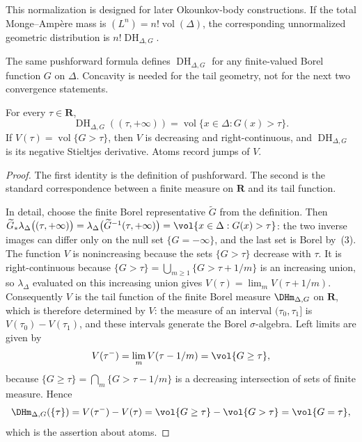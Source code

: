 This normalization is designed for later Okounkov-body constructions.  If
the total Monge--Amp\`ere mass is $(L^n)=n!\operatorname{vol}(\Delta)$, the
corresponding unnormalized geometric distribution is
$n!\operatorname{DH}_{\Delta,G}$.

The same pushforward formula defines $\operatorname{DH}_{\Delta,G}$ for any
finite-valued Borel function $G$ on $\Delta$.  Concavity is needed for the
tail geometry, not for the next two convergence statements.

\begin{proposition}\label{prop:dh-tail}
For every $\tau\in\mathbf R$,
\[
 \operatorname{DH}_{\Delta,G}((\tau,+\infty))
 =\operatorname{vol}\{x\in\Delta:G(x)>\tau\}.
\]
If
$V(\tau)=\operatorname{vol}\{G>\tau\}$, then $V$ is decreasing and
right-continuous, and $\operatorname{DH}_{\Delta,G}$ is its negative
Stieltjes derivative.  Atoms record jumps of $V$.
\end{proposition}

\begin{proof}
The first identity is the definition of pushforward.  The second is the
standard correspondence between a finite measure on $\mathbf R$ and its tail
function.

In detail, choose the finite Borel representative $\widetilde G$ from the
definition.  Then
$\widetilde G_*\lambda_\Delta\bigl((\tau,+\infty)\bigr)
=\lambda_\Delta\bigl(\widetilde G^{-1}(\tau,+\infty)\bigr)
=\vol\{x\in\Delta:G(x)>\tau\}$: the two inverse images can differ only on
the null set $\{G=-\infty\}$, and the last set is Borel by
\,(3).  The function $V$ is
nonincreasing because the sets $\{G>\tau\}$ decrease with $\tau$.  It is
right-continuous because
$\{G>\tau\}=\bigcup_{m\geq1}\{G>\tau+1/m\}$ is an increasing union, so
$\lambda_\Delta$ evaluated on this increasing union gives
$V(\tau)=\lim_mV(\tau+1/m)$.  Consequently $V$ is the tail function of the finite Borel measure
$\DHm_{\Delta,G}$ on $\mathbf R$, which is therefore determined by $V$: the
measure of an interval $(\tau_0,\tau_1]$ is $V(\tau_0)-V(\tau_1)$, and these
intervals generate the Borel $\sigma$-algebra.  Left limits are given by
\[
 V(\tau^-)=\lim_{m}V(\tau-1/m)=\vol\{G\geq\tau\},
\]
because $\{G\geq\tau\}=\bigcap_m\{G>\tau-1/m\}$ is a decreasing intersection
of sets of finite measure.  Hence
\[
 \DHm_{\Delta,G}(\{\tau\})=V(\tau^-)-V(\tau)
 =\vol\{G\geq\tau\}-\vol\{G>\tau\}=\vol\{G=\tau\},
\]
which is the assertion about atoms.
\end{proof}


